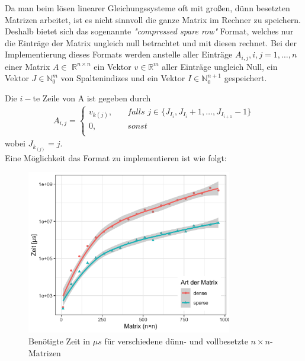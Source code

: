 \documentclass[12pt,a4paper]{scrartcl}
\numberwithin{equation}{section}
\numberwithin{myalgctr}{section}
\numberwithin{mytheoremctr}{subsection}
\numberwithin{mykorollarctr}{subsection}
\numberwithin{mylemmactr}{subsection}
\numberwithin{mybeispielctr}{subsection}
\begin{document}
	\newpage
	
	Da man beim lösen linearer Gleichungssysteme oft mit großen, dünn besetzten Matrizen arbeitet, ist es nicht sinnvoll die ganze Matrix im Rechner zu speichern. Deshalb bietet sich das sogenannte \textit{"compressed spare row"} Format, welches nur die Einträge der Matrix ungleich null betrachtet und mit diesen rechnet. Bei der Implementierung dieses Formats werden anstelle aller Einträge $A_{i,j}, i,j = 1,\ldots,n$ einer Matrix $A\in$ $\mathbb{R}^{n\times n}$ ein Vektor $v\in\mathbb{R}^{m}$ aller Einträge ungleich Null, ein Vektor $J\in\mathbb{N}_0^{m}$ von Spaltenindizes und ein Vektor $I\in\mathbb{N}_0^{n+1}$ gespeichert.
	
	Die $i-$te Zeile von A ist gegeben durch
	\begin{align*}
		A_{i,j} = 
		\begin{cases}
			\textit{$v_{k(j)}$},&\quad\textit{falls $j \in \{J_{I_i}, J_{I_{i}} + 1, \ldots, J_{I_{i+1}} - 1$}\}\\
			\textit{0},&\quad\textit{sonst}\\
		\end{cases}
	\end{align*} 
	wobei $J_{k_{(j)}} = j$.\\
	
	Eine Möglichkeit das Format zu implementieren ist wie folgt:
	
	 
	
	 
	
	
	
	
	\begin{figure}[H]
		\begin{center}
			\includegraphics[width=0.8\textwidth]{../plots/cg-dense-vs-sparse.png}
		\end{center}
		\caption{Ben\"otigte Zeit in $\mu s$ f\"ur verschiedene d\"unn- und vollbesetzte $n\times n$-Matrizen}
		\label{fig:zeitcg}	
	\end{figure}
\end{document}
